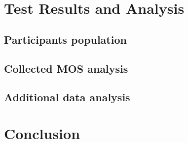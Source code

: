 \documentclass[conference,compsoc]{IEEEtran}
\begin{document}
\section{Test Results and Analysis}



\subsection{Participants population}
\label{sec:participant_population}



\subsection{Collected MOS analysis}
\label{sec:ratings}



\subsection{Additional data analysis}
\label{sec:features}



\section{Conclusion}







\end{document}

